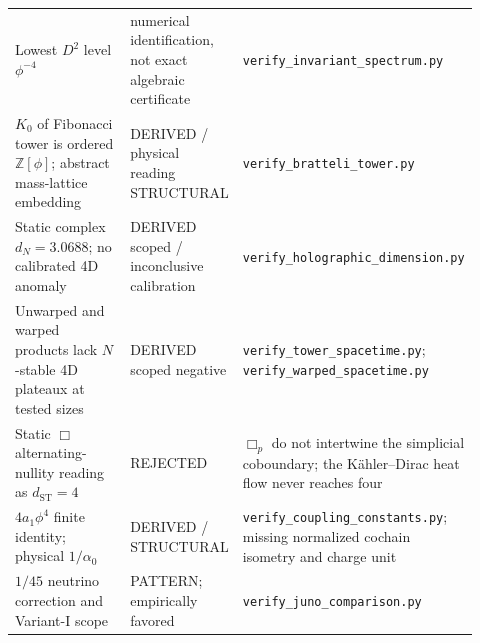 \documentclass[12pt,a4paper]{article}
\theoremstyle{definition}
\begin{document}
\begin{longtable}{p{0.39\linewidth}p{0.15\linewidth}p{0.38\linewidth}}
Lowest $D^2$ level $\phi^{-4}$ & numerical identification, not exact algebraic certificate & \texttt{verify\_invariant\_spectrum.py}\\
$K_0$ of Fibonacci tower is ordered $\mathbb Z[\phi]$; abstract mass-lattice embedding & DERIVED / physical reading STRUCTURAL & \texttt{verify\_bratteli\_tower.py}\\
Static complex $d_N=3.0688$; no calibrated 4D anomaly & DERIVED scoped / inconclusive calibration & \texttt{verify\_holographic\_dimension.py}\\
Unwarped and warped products lack $N$-stable 4D plateaux at tested sizes & DERIVED scoped negative & \texttt{verify\_tower\_spacetime.py}; \texttt{verify\_warped\_spacetime.py}\\
Static $\Box$ alternating-nullity reading as $d_{\mathrm{ST}}=4$ & REJECTED & $\Box_p$ do not intertwine the simplicial coboundary; the K\"ahler--Dirac heat flow never reaches four\\
$4a_1\phi^4$ finite identity; physical $1/\alpha_0$ & DERIVED / STRUCTURAL & \texttt{verify\_coupling\_constants.py}; missing normalized cochain isometry and charge unit\\
$1/45$ neutrino correction and Variant-I scope & PATTERN; empirically favored & \texttt{verify\_juno\_comparison.py}\\
\bottomrule
\end{longtable}
\end{document}
